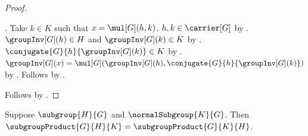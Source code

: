 \begin{proof}
\begin{subproof}
            .
        Take $k\in K$ such that $x=\mul[G](h,k)$.
        $h,k\in\carrier[G]$ by
            .
        $\groupInv[G](h)\in H$ and $\groupInv[G](k)\in K$ by
            .
        $\conjugate{G}{h}{\groupInv[G](k)}\in K$ by
            .
        $\groupInv[G](x)=
            \mul[G]
                (\groupInv[G](h),
                 \conjugate{G}{h}{\groupInv[G](k)})$ by
            .
        Follows by .
    \end{subproof}
    Follows by .
\end{proof}

\begin{theorem}\label{subgroup_product_commutes_if_right_normal}
    Suppose $\subgroup{H}{G}$ and $\normalSubgroup{K}{G}$.
    Then
        $\subgroupProduct{G}{H}{K}=\subgroupProduct{G}{K}{H}$.
\end{theorem}
